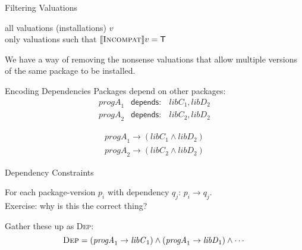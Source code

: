 \documentclass[xetex,aspectratio=169,14pt,hyperref={pdfpagelabels=true,pdflang={en-GB}}]{beamer}
\begin{document}
\begin{frame}
  {Filtering Valuations}

   all valuations (installations) $v$ \\
   only valuations such that $\llbracket \textsc{Incompat} \rrbracket v = \mathsf{T}$

  \bigskip

   We have a way of removing the nonsense
  valuations that allow multiple versions of the same package to be
  installed.
\end{frame}






\begin{frame}[t]
  {Encoding Dependencies}
   Packages depend on other packages:
  \begin{displaymath}
    \begin{array}{lcl}
      \mathit{progA}_1&\mathsf{depends:}&\mathit{libC}_1, \mathit{libD}_2 \\
      \mathit{progA}_2&\mathsf{depends:}&\mathit{libC}_2, \mathit{libD}_2
    \end{array}
  \end{displaymath}

  \pause
  \bigskip
  \begin{displaymath}
    \begin{array}{l}
      \mathit{progA}_1 \to (\mathit{libC}_1 \land \mathit{libD}_2) \\
      \mathit{progA}_2 \to (\mathit{libC}_2 \land \mathit{libD}_2)
    \end{array}
  \end{displaymath}
\end{frame}

\begin{frame}
  {Dependency Constraints}

  \pause
  \bigskip
  For each package-version $p_i$ with dependency $q_j$: $p_i \to q_j$. \\
  \qquad \textcolor{black!60}{Exercise: why is this the correct thing?}

  \pause
  \bigskip

  Gather these up as \textsc{Dep}:
  \begin{displaymath}
    \textsc{Dep} = (\mathit{progA}_1 \to \mathit{libC}_1) \land (\mathit{progA}_1 \to \mathit{libD}_1) \land \cdots
  \end{displaymath}

\end{frame}
\end{document}
